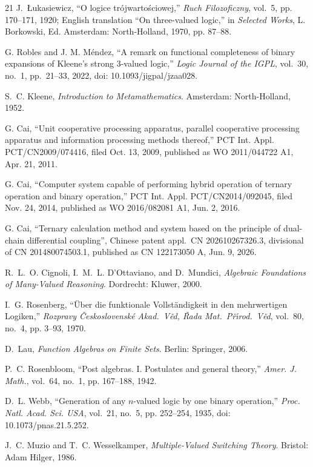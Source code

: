 \documentclass[conference]{IEEEtran}
\theoremstyle{remark}
\begin{document}
\begin{thebibliography}{21}
		J.~{\L}ukasiewicz, ``O logice tr{\'o}jwarto{\'s}ciowej,'' \emph{Ruch Filozoficzny}, vol.~5, pp. 170--171, 1920; English translation ``On three-valued logic,'' in \emph{Selected Works}, L. Borkowski, Ed. Amsterdam: North-Holland, 1970, pp. 87--88.
		
		G. Robles and J. M. M\'endez, ``A remark on functional completeness of binary expansions of Kleene's strong 3-valued logic,'' \emph{Logic Journal of the IGPL}, vol.~30, no.~1, pp.~21--33, 2022, doi: 10.1093/jigpal/jzaa028.
		
		S.~C. Kleene, \emph{Introduction to Metamathematics}. Amsterdam: North-Holland, 1952.
		
		G. Cai, ``Unit cooperative processing apparatus, parallel cooperative processing apparatus and information processing methods thereof,'' PCT Int. Appl. PCT/CN2009/074416, filed Oct. 13, 2009, published as WO 2011/044722 A1, Apr. 21, 2011.
		
		G. Cai, ``Computer system capable of performing hybrid operation of ternary operation and binary operation,'' PCT Int. Appl. PCT/CN2014/092045, filed Nov. 24, 2014, published as WO 2016/082081 A1, Jun. 2, 2016.
		
		G. Cai, ``Ternary calculation method and system based on the principle of dual-chain differential coupling'', Chinese patent appl.\ CN 202610267326.3, divisional of CN 201480074503.1, published as CN 122173050 A, Jun. 9, 2026.
		
		R.~L.~O. Cignoli, I.~M.~L. D'Ottaviano, and D.~Mundici, \emph{Algebraic Foundations of Many-Valued Reasoning}. Dordrecht: Kluwer, 2000.
		
		I.~G. Rosenberg, ``{\"U}ber die funktionale Vollst{\"a}ndigkeit in den mehrwertigen Logiken,'' \emph{Rozpravy {\v C}eskoslovensk{\'e} Akad.\ V{\v e}d, {\v R}ada Mat.\ P{\v r}{\'\i}rod.\ V{\v e}d}, vol.~80, no.~4, pp. 3--93, 1970.
		
		D.~Lau, \emph{Function Algebras on Finite Sets}. Berlin: Springer, 2006.
		
		P.~C. Rosenbloom, ``Post algebras. {I}. {P}ostulates and general theory,'' \emph{Amer. J. Math.}, vol.~64, no.~1, pp. 167--188, 1942.
		
		D.~L. Webb, ``Generation of any $n$-valued logic by one binary operation,'' \emph{Proc. Natl. Acad. Sci. USA}, vol.~21, no.~5, pp. 252--254, 1935, doi: 10.1073/pnas.21.5.252.
		
		J.~C. Muzio and T.~C. Wesselkamper, \emph{Multiple-Valued Switching Theory}. Bristol: Adam Hilger, 1986.
		
		
	\end{thebibliography}
	
\end{document}
